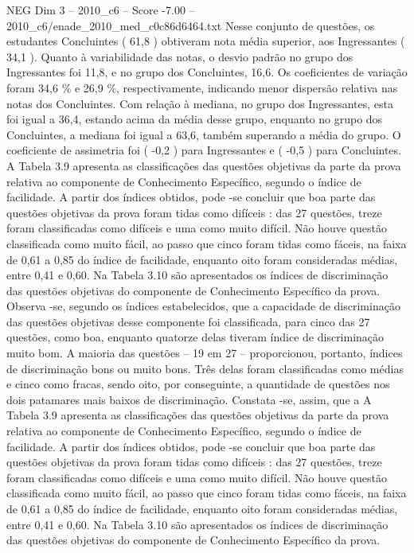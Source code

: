 \begin{textsample}{NEG Dim 3 – 2010\_c6 – Score -7.00 – 2010\_c6/enade\_2010\_med\_c0c86d6464.txt}
Nesse conjunto de questões, os estudantes Concluintes ( 61,8 ) obtiveram nota média superior, aos Ingressantes ( 34,1 ).
Quanto à variabilidade das notas, o desvio padrão no grupo dos Ingressantes foi 11,8, e no grupo dos Concluintes, 16,6.
Os coeficientes de variação foram 34,6 \% e 26,9 \%, respectivamente, indicando menor dispersão relativa nas notas dos Concluintes.
Com relação à mediana, no grupo dos Ingressantes, esta foi igual a 36,4, estando acima da média desse grupo, enquanto no grupo dos Concluintes, a mediana foi igual a 63,6, também superando a média do grupo.
O coeficiente de assimetria foi ( -0,2 ) para Ingressantes e ( -0,5 ) para Concluintes.
A Tabela 3.9 apresenta as classificações das questões objetivas da parte da prova relativa ao componente de Conhecimento Específico, segundo o índice de facilidade.
A partir dos índices obtidos, pode -se concluir que boa parte das questões objetivas da prova foram tidas como difíceis : das 27 questões, treze foram classificadas como difíceis e uma como muito difícil.
Não houve questão classificada como muito fácil, ao passo que cinco foram tidas como fáceis, na faixa de 0,61 a 0,85 do índice de facilidade, enquanto oito foram consideradas médias, entre 0,41 e 0,60.
Na Tabela 3.10 são apresentados os índices de discriminação das questões objetivas do componente de Conhecimento Específico da prova.
Observa -se, segundo os índices estabelecidos, que a capacidade de discriminação das questões objetivas desse componente foi classificada, para cinco das 27 questões, como boa, enquanto quatorze delas tiveram índice de discriminação muito bom.
A maioria das questões – 19 em 27 – proporcionou, portanto, índices de discriminação bons ou muito bons.
Três delas foram classificadas como médias e cinco como fracas, sendo oito, por conseguinte, a quantidade de questões nos dois patamares mais baixos de discriminação.
Constata -se, assim, que a A Tabela 3.9 apresenta as classificações das questões objetivas da parte da prova relativa ao componente de Conhecimento Específico, segundo o índice de facilidade.
A partir dos índices obtidos, pode -se concluir que boa parte das questões objetivas da prova foram tidas como difíceis : das 27 questões, treze foram classificadas como difíceis e uma como muito difícil.
Não houve questão classificada como muito fácil, ao passo que cinco foram tidas como fáceis, na faixa de 0,61 a 0,85 do índice de facilidade, enquanto oito foram consideradas médias, entre 0,41 e 0,60.
Na Tabela 3.10 são apresentados os índices de discriminação das questões objetivas do componente de Conhecimento Específico da prova.

\end{textsample}
